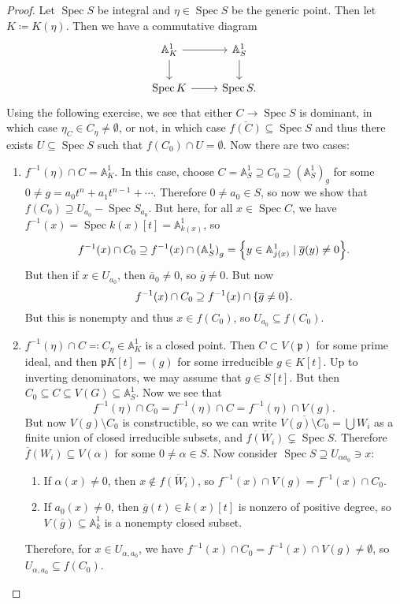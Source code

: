 \documentclass[leqno, openany]{memoir}
\theoremstyle{definition}
\theoremstyle{remark}
\theoremstyle{plain}
\theoremstyle{definition}
\theoremstyle{remark}
\newcommand{\A}{\mathbb{A}}
\newcommand{\mf}[1]{\mathfrak{#1}}
\newcommand{\ol}[1]{\overline{#1}}
\DeclareMathOperator{\Spec}{Spec}
\begin{document}
\begin{proof}
    Let $\Spec S$ be integral and $\eta \in \Spec S$ be the generic point. Then let $K \coloneqq K(\eta)$. Then we have a commutative diagram
    \begin{equation*}
    \begin{tikzcd}
        \A^1_K \arrow{r} \ar{d} & \A^1_S \ar{d} \\
        \Spec K \ar{r} & \Spec S.
    \end{tikzcd}
    \end{equation*}
    Using the following exercise, we see that either $C \to \Spec S$ is dominant, in which case $\eta_C \in C_{\eta} \neq \emptyset$, or not, in which case $\ol{f(C)} \subseteq \Spec S$ and thus there exists $U \subseteq \Spec S$ such that $f(C_0) \cap U = \emptyset$. Now there are two cases:
    \begin{enumerate}
        \item $f^{-1}(\eta) \cap C = \A^1_K$. In this case, choose $C = \A^1_S \supseteq C_0 \supseteq {(\A^1_S)}_g$ for some $0 \neq g = a_0 t^n + a_1 t^{n-1} + \cdots$. Therefore $0 \neq a_0 \in S$, so now we show that $f(C_0) \supseteq U_{a_0} - \Spec S_{a_0}$. But here, for all $x \in \Spec C$, we have $f^{-1}(x) = \Spec k(x)[t] = \A^1_{k(x)}$, so 
            \[ f^{-1}(x) \cap C_0 \supseteq f^{-1}(x) \cap {(\A^1_S)}_g = \qty{y \in \A^1_{j(x)} \mid \ol{g}(y) \neq 0}. \]
            But then if $x \in U_{a_0}$, then $\ol{a}_0 \neq 0$, so $\ol{g} \neq 0$. But now
            \[ f^{-1}(x) \cap C_0 \supseteq f^{-1}(x) \cap \qty{\ol{g} \neq 0}. \]
            But this is nonempty and thus $x \in f(C_0)$, so $U_{a_0} \subseteq f(C_0)$.
        \item $f^{-1}(\eta) \cap C \eqqcolon C_{\eta} \in \A^1_K$ is a closed point. Then $C \subset V(\mf{p})$ for some prime ideal, and then $\mf{p} K[t] = (g)$ for some irreducible $g \in K[t]$. Up to inverting denominators, we may assume that $g \in S[t]$. But then $C_0 \subseteq C \subseteq V(G) \subseteq \A^1_S$. Now we see that 
            \[ f^{-1}(\eta) \cap C_0 = f^{-1}(\eta) \cap C = f^{-1}(\eta) \cap V(g). \]
            But now $V(g) \setminus C_0$ is constructible, so we can write $\ol{V(g) \setminus C_0} = \bigcup W_i$ as a finite union of closed irreducible subsets, and $\ol{f(W_i)} \subsetneq \Spec S$. Therefore $\ol{f}(W_i) \subseteq V(\alpha)$ for some $0 \neq \alpha \in S$. Now consider $\Spec S \supseteq U_{\alpha a_0} \ni x$:
            \begin{enumerate}
                \item If $\alpha(x) \neq 0$, then $x \notin \ol{f(W_i)}$, so $f^{-1}(x) \cap V(g) = f^{-1}(x) \cap C_0$.
                \item If $a_0(x) \neq 0$, then $\ol{g}(t) \in k(x)[t]$ is nonzero of positive degree, so $V(\ol{g}) \subseteq \A^1_k$ is a nonempty closed subset.
            \end{enumerate}
            Therefore, for $x \in U_{\alpha, a_0}$, we have $f^{-1}(x) \cap C_0 = f^{-1}(x) \cap V(g) \neq \emptyset$, so $U_{\alpha, a_0} \subseteq f(C_0)$. \qedhere
    \end{enumerate}
\end{proof}
\end{document}
